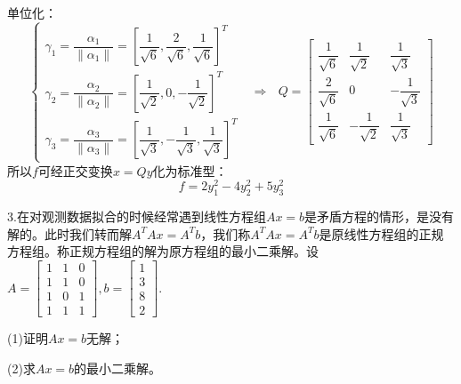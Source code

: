 \documentclass{article}
\begin{document}
\begin{jie}
单位化：
\begin{equation*}
\begin{cases}
\gamma_1=\dfrac{\alpha_1}{\|\alpha_1\|}=\left[\dfrac{1}{\sqrt{6}},\dfrac{2}{\sqrt{6}},\dfrac{1}{\sqrt{6}}\right]^T\\[2mm]
\gamma_2=\dfrac{\alpha_2}{\|\alpha_2\|}=\left[\dfrac{1}{\sqrt{2}},0,-\dfrac{1}{\sqrt{2}}\right]^T\\[2mm]
\gamma_3=\dfrac{\alpha_3}{\|\alpha_3\|}=\left[\dfrac{1}{\sqrt{3}},-\dfrac{1}{\sqrt{3}},\dfrac{1}{\sqrt{3}}\right]^T
\end{cases}~~~\Rightarrow~~~Q=
\begin{bmatrix}
\dfrac{1}{\sqrt{6}}&\dfrac{1}{\sqrt{2}}&\dfrac{1}{\sqrt{3}}\\[2mm]
\dfrac{2}{\sqrt{6}}&0&-\dfrac{1}{\sqrt{3}}\\[2mm]
\dfrac{1}{\sqrt{6}}&-\dfrac{1}{\sqrt{2}}&\dfrac{1}{\sqrt{3}}
\end{bmatrix}
\end{equation*}
所以$f$可经正交变换$x=Qy$化为标准型：
\begin{equation*}
  f=2y_{1}^2-4y_{2}^2+5y_{3}^2
\end{equation*}
\end{jie}

3.在对观测数据拟合的时候经常遇到线性方程组$Ax=b$是矛盾方程的情形，是没有解的。此时我们转而解$A^{T}Ax=A^{T}b$，我们称$A^{T}Ax=A^{T}b$是原线性方程组的正规方程组。称正规方程组的解为原方程组的最小二乘解。设
$
A=
\begin{bmatrix}
  1 & 1 & 0\\
  1 & 1 & 0\\
  1 & 0 & 1\\
  1 & 1 & 1
\end{bmatrix},b=
\begin{bmatrix}
1 \\ 3 \\ 8 \\ 2
\end{bmatrix}
$.

(1)证明$Ax=b$无解；

(2)求$Ax=b$的最小二乘解。
\end{document}
